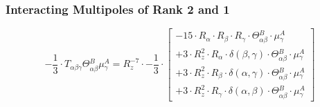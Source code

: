 \documentclass{article}
\begin{document}
\subsubsection{Interacting Multipoles of Rank 2 and 1}
\begin{equation}
- \frac{1}{3} \cdot T_{\alpha{}\beta{}\gamma{}} \Theta{}^{B}_{\alpha{}\beta{}} \mu{}^{A}_{\gamma{}} = R_{z}^{-7} \cdot - \frac{1}{3} \cdot  \left[ \begin{array}{c} 
 		- 15 \cdot R_{\alpha{}} \cdot R_{\beta{}} \cdot R_{\gamma{}} \cdot \Theta{}^{B}_{\alpha{}\beta{}} \cdot \mu{}^{A}_{\gamma{}} 
 \\[0.2em] 		 + 3 \cdot R_{z}^{2} \cdot R_{\alpha{}} \cdot \delta{}\left(\beta{}, \gamma{}\right) \cdot \Theta{}^{B}_{\alpha{}\beta{}} \cdot \mu{}^{A}_{\gamma{}} 
 \\[0.2em] 		 + 3 \cdot R_{z}^{2} \cdot R_{\beta{}} \cdot \delta{}\left(\alpha{}, \gamma{}\right) \cdot \Theta{}^{B}_{\alpha{}\beta{}} \cdot \mu{}^{A}_{\gamma{}} 
 \\[0.2em] 		 + 3 \cdot R_{z}^{2} \cdot R_{\gamma{}} \cdot \delta{}\left(\alpha{}, \beta{}\right) \cdot \Theta{}^{B}_{\alpha{}\beta{}} \cdot \mu{}^{A}_{\gamma{}}
 \end{array}\right] 
\end{equation}
\end{document}
